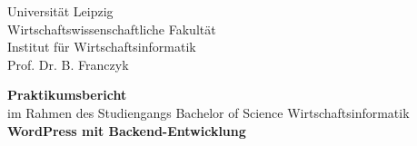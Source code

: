 
\newcommand{\trtitleone}{WordPress mit Backend-Entwicklung}
\newcommand{\trtitletwo}{}
\newcommand{\trtype}{Bachelorarbeit zur Erlangung des akademischen Grades}
\newcommand{\trabschluss}{Bachelor of Science}
\newcommand{\trauthor}{Li, Ye}
\newcommand{\trstrasse}{Bornaische Straße 138}
\newcommand{\trmatrikelnummer}{14524}
\newcommand{\trplz}{04109}
\newcommand{\trort}{Leipzig}
\newcommand{\tremail}{himmel609@hotmail.com}
\newcommand{\trtelefon}{012345 67890}
\newcommand{\truni}{Universität Leipzig}
\newcommand{\trfakultaet}{Wirtschaftswissenschaftliche Fakultät}
\newcommand{\trfachbereich}{Institut für Wirtschaftsinformatik}
\newcommand{\trstudiengang}{Wirtschaftsinformatik}
\newcommand{\trprofessor}{Prof. Dr. B. Franczyk}

\newcommand{\trdate}{\today}

\thispagestyle{empty}

\begin{center}
\truni\\
\trfakultaet\\
\trfachbereich\\
\trprofessor
\end{center}

\vspace{1.5cm}

\begin{center}
	\textbf{Praktikumsbericht}\\
	im Rahmen des Studiengangs Bachelor of Science Wirtschaftsinformatik\\[1cm]
	\textbf{\large \trtitleone}\\[0.1cm]
	\textbf{\large \trtitletwo}
\end{center}

\vspace{2.7cm}

